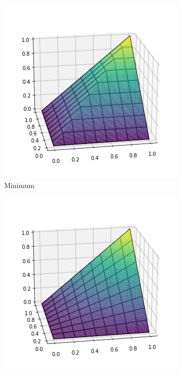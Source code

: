 \begin{figure}[h]
    \centering
    \begin{subfigure}[b]{0.2\textwidth}
        \centering
        \includegraphics[width=\textwidth]{imgs/fuzzy_min_and.png}
        \caption{Minimum}
        \label{fig:minconj}
    \end{subfigure}
    \begin{subfigure}[b]{0.2\textwidth}
        \centering
        \includegraphics[width=\textwidth]{imgs/fuzzy_prod_and.png}

\end{subfigure}
\end{figure}
